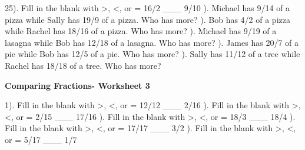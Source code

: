 \documentclass{article}%
\begin{document}
25). Fill in the blank with >, <, or = 16/2 \_\_\_ 9/10%
\newline%
\newline%
). Michael has 9/14 of a pizza while Sally has 19/9 of a pizza. Who has more?%
\newline%
\newline%
). Bob has 4/2 of a pizza while Rachel has 18/16 of a pizza. Who has more?%
\newline%
\newline%
). Michael has 9/19 of a lasagna while Bob has 12/18 of a lasagna. Who has more?%
\newline%
\newline%
). James has 20/7 of a pie while Bob has 12/5 of a pie. Who has more?%
\newline%
\newline%
). Sally has 11/12 of a tree while Rachel has 18/18 of a tree. Who has more?%
\newline%
\newline%
\newline%
\pagebreak%
\large%
\begin{center}%
\textbf{Comparing Fractions- Worksheet 3}%
\newline%
\end{center} \normalsize%
1). Fill in the blank with >, <, or = 12/12 \_\_\_ 2/16%
\newline%
\newline%
). Fill in the blank with >, <, or = 2/15 \_\_\_ 17/16%
\newline%
\newline%
). Fill in the blank with >, <, or = 18/3 \_\_\_ 18/4%
\newline%
\newline%
). Fill in the blank with >, <, or = 17/17 \_\_\_ 3/2%
\newline%
\newline%
). Fill in the blank with >, <, or = 5/17 \_\_\_ 1/7%
\newline%
\newline%
\newline%
\end{document}
